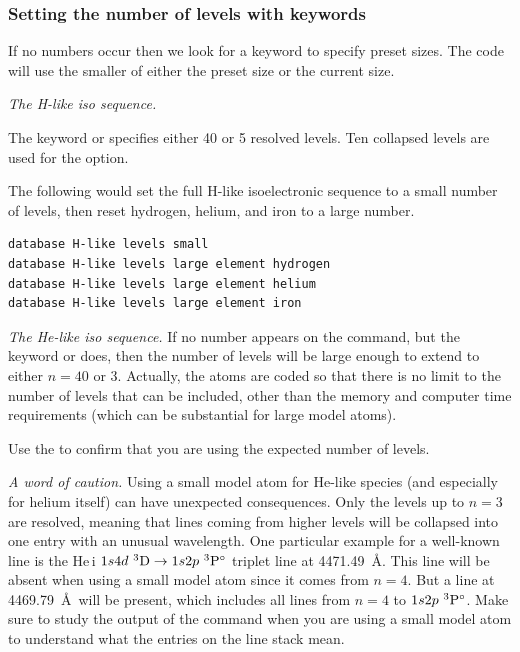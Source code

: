 \subsubsection{Setting the number of levels with keywords}

If no numbers occur then we look for a keyword to specify preset sizes.
The code will use the smaller of either the preset size or the current size.

\emph{The H-like iso sequence.}

The keyword
 or 
specifies either 40 or 5 resolved levels.
Ten collapsed levels are used for the  option.

The following would set the full H-like isoelectronic
sequence to a small number of levels, then reset hydrogen, helium,
and iron to a large number.
\begin{verbatim}
database H-like levels small
database H-like levels large element hydrogen
database H-like levels large element helium
database H-like levels large element iron
\end{verbatim}

\emph{The He-like iso sequence.}
If no number appears on the command, but the keyword  or
 does,
then the number of levels will be large enough to extend
to either $n = 40$ or 3.
Actually, the atoms are
coded so that there is no limit to the number of levels that
can be included, other than the memory and computer time requirements
(which can be substantial for large model atoms).

Use the  to confirm that you are using
the expected number of levels.

{\it A word of caution.} Using a small model atom for He-like species (and
especially for helium itself) can have unexpected consequences. Only the
levels up to $n = 3$ are resolved, meaning that lines coming from higher
levels will be collapsed into one entry with an unusual wavelength. One
particular example for a well-known line is the He\,{\sc i} $1s4d\ ^{3}{\rm D}
\rightarrow 1s2p\ ^{3}{\rm P}^\circ$ triplet line at 4471.49~\AA. This line
will be absent when using a small model atom since it comes from $n = 4$. But
a line at 4469.79~\AA\ will be present, which includes all lines from $n=4$ to
$1s2p\ ^{3}{\rm P}^\circ$. Make sure to study the output of the
 command when you are using a small model atom to
understand what the entries on the line stack mean.

